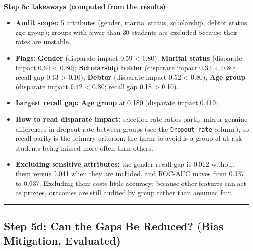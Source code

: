 \documentclass[11pt]{article}
\providecommand{\tightlist}{%
      \setlength{\itemsep}{0pt}\setlength{\parskip}{0pt}}
\begin{document}
    \begin{center}
    \end{center}
    { \hspace*{\fill} \\}
    
    \textbf{Step 5c takeaways (computed from the results)}

\begin{itemize}
\tightlist
\item
  \textbf{Audit scope:} 5 attributes (gender, marital status,
  scholarship, debtor status, age group); groups with fewer than 30
  students are excluded because their rates are unstable.
\item
  \textbf{Flags:} \textbf{Gender} (disparate impact 0.59 \textless{}
  0.80); \textbf{Marital status} (disparate impact 0.64 \textless{}
  0.80); \textbf{Scholarship holder} (disparate impact 0.32 \textless{}
  0.80; recall gap 0.13 \textgreater{} 0.10); \textbf{Debtor} (disparate
  impact 0.52 \textless{} 0.80); \textbf{Age group} (disparate impact
  0.42 \textless{} 0.80; recall gap 0.18 \textgreater{} 0.10).
\item
  \textbf{Largest recall gap:} \textbf{Age group} at 0.180 (disparate
  impact 0.419).
\item
  \textbf{How to read disparate impact:} selection-rate ratios partly
  mirror genuine differences in dropout rate between groups (see the
  \texttt{Dropout\ rate} column), so recall parity is the primary
  criterion; the harm to avoid is a group of at-risk students being
  missed more often than others.
\item
  \textbf{Excluding sensitive attributes:} the gender recall gap is
  0.012 without them versus 0.041 when they are included, and ROC-AUC
  moves from 0.937 to 0.937. Excluding them costs little accuracy;
  because other features can act as proxies, outcomes are still audited
  by group rather than assumed fair.
\end{itemize}

    
    \begin{center}\rule{0.5\linewidth}{0.5pt}\end{center}

\hypertarget{step-5d-can-the-gaps-be-reduced-bias-mitigation-evaluated}{%
\subsection{Step 5d: Can the Gaps Be Reduced? (Bias Mitigation,
Evaluated)}\label{step-5d-can-the-gaps-be-reduced-bias-mitigation-evaluated}}
\end{document}
